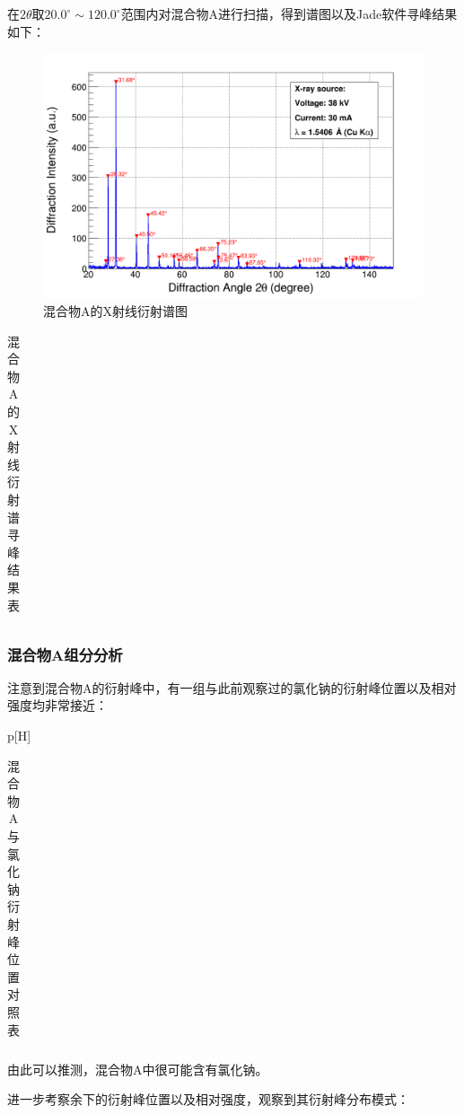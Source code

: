\documentclass{thuemp}
\begin{document}
在$2\theta$取$20.0^\circ \sim 120.0^\circ$范围内对混合物A进行扫描，得到谱图以及Jade软件寻峰结果如下：

\begin{figure}[H]
    \centering
    \includegraphics[width=0.8\linewidth]{../Data/Mixture.png}
    \caption{混合物A的X射线衍射谱图}
    \label{fig:mixture_a_xrd}
\end{figure}

\begin{table}
    \centering
    \captionnamefont{\wuhao\bf\heiti}
    \captiontitlefont{\wuhao\bf\heiti}
    \caption{混合物A的X射线衍射谱寻峰结果表}
    \label{tab:mixture_a_xrd}
    \liuhao
    \begin{tabular}{ccccc}
        \toprule
        \midrule
        \bottomrule
    \end{tabular}
\end{table}

\subsubsection{混合物A组分分析}

注意到混合物A的衍射峰中，有一组与此前观察过的氯化钠的衍射峰位置以及相对强度均非常接近：

\begin{table}p[H]
    \centering
    \captionnamefont{\wuhao\bf\heiti}
    \captiontitlefont{\wuhao\bf\heiti}
    \caption{混合物A与氯化钠衍射峰位置对照表}
    \label{tab:mixture_a_nacl_peaks}
    \liuhao
    \begin{tabular}{ccccc}
        \toprule
        \midrule
        \bottomrule
    \end{tabular}
\end{table}

由此可以推测，混合物A中很可能含有氯化钠。

进一步考察余下的衍射峰位置以及相对强度，观察到其衍射峰分布模式：
\end{document}
